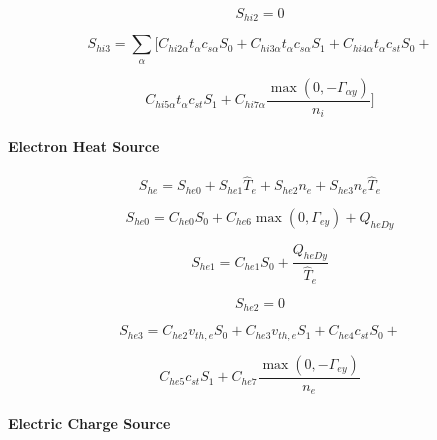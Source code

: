 \documentclass[11pt]{article}
\begin{document}
\begin{equation}
S_{hi2}=0   \label{32}
\end{equation}

\begin{equation*}
S_{hi3}=\sum_{\alpha}[C_{hi2\alpha}t_{\alpha}c_{s\alpha}S_{0}+C_{hi3\alpha
}t_{\alpha}c_{s\alpha}S_{1}+C_{hi4\alpha}t_{\alpha}c_{st}S_{0}+ 
\end{equation*}

\begin{equation}
C_{hi5\alpha}t_{\alpha}c_{st}S_{1}+C_{hi7\alpha}\frac{\max\left(
0,-\Gamma_{\alpha y}\right) }{n_{i}}]   \label{33}
\end{equation}

\bigskip

\paragraph{Electron Heat Source}

\begin{equation}
S_{he}=S_{he0}+S_{he1}\widehat{T}_{e}+S_{he2}n_{e}+S_{he3}n_{e}\widehat{T}%
_{e}   \label{34}
\end{equation}

\begin{equation}
S_{he0}=C_{he0}S_{0}+C_{he6}\max\left( 0,\Gamma_{ey}\right) +Q_{heDy} 
\label{35}
\end{equation}

\begin{equation}
S_{he1}=C_{he1}S_{0}+\frac{Q_{heDy}}{\widehat{T}_{e}}   \label{36}
\end{equation}

\begin{equation}
S_{he2}=0   \label{37}
\end{equation}

\begin{equation*}
S_{he3}=C_{he2}v_{th,e}S_{0}+C_{he3}v_{th,e}S_{1}+C_{he4}c_{st}S_{0}+ 
\end{equation*}

\begin{equation}
C_{he5}c_{st}S_{1}+C_{he7}\frac{\max\left( 0,-\Gamma_{ey}\right) }{n_{e}} 
\label{38}
\end{equation}

\bigskip

\paragraph{Electric Charge Source}
\end{document}
